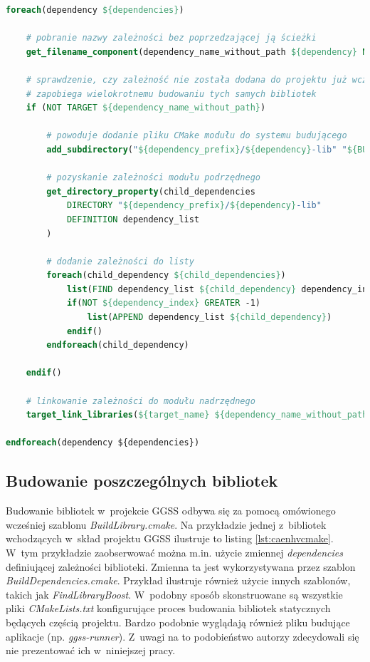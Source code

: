 \begin{lstlisting}[language=cmake, caption={Plik \textit{BuildDependencies.cmake} będący częścią systemu budującego projekt GGSS. Zawiera pętlę iterującą po zależnościach aktualnie budowanego modułu. Zależności te dodawane są do systemu budującego za pomocą polecenia \textit{add\_subdirectory}. Dołączone do listingu komentarze stanowią wytłumaczenie działania poszczególnych elementów pliku.}, label={lst:builddependenciescmake}]
foreach(dependency ${dependencies})
    
    # pobranie nazwy zależności bez poprzedzającej ją ścieżki
    get_filename_component(dependency_name_without_path ${dependency} NAME)

    # sprawdzenie, czy zależność nie została dodana do projektu już wcześniej - 
    # zapobiega wielokrotnemu budowaniu tych samych bibliotek
    if (NOT TARGET ${dependency_name_without_path})

        # powoduje dodanie pliku CMake modułu do systemu budującego
        add_subdirectory("${dependency_prefix}/${dependency}-lib" "${BUILD_OUTPUT_DIRECTORY}/${dependency_name_without_path}-lib/build")

        # pozyskanie zależności modułu podrzędnego 
        get_directory_property(child_dependencies 
            DIRECTORY "${dependency_prefix}/${dependency}-lib" 
            DEFINITION dependency_list
        )

        # dodanie zależności do listy 
        foreach(child_dependency ${child_dependencies})
            list(FIND dependency_list ${child_dependency} dependency_index)
            if(NOT ${dependency_index} GREATER -1)
                list(APPEND dependency_list ${child_dependency})
            endif()
        endforeach(child_dependency)
        
    endif()

    # linkowanie zależności do modułu nadrzędnego
    target_link_libraries(${target_name} ${dependency_name_without_path})

endforeach(dependency ${dependencies})
\end{lstlisting}


\subsection{Budowanie poszczególnych bibliotek}
Budowanie bibliotek w~projekcie GGSS odbywa się za pomocą omówionego wcześniej szablonu \textit{BuildLibrary.cmake}. Na przykładzie jednej z~bibliotek wchodzących w~skład projektu GGSS ilustruje to listing \ref{lst:caenhvcmake}. W~tym przykładzie zaobserwować można m.in. użycie zmiennej \textit{dependencies} definiującej zależności biblioteki. Zmienna ta jest wykorzystywana przez szablon \textit{BuildDependencies.cmake}. Przykład ilustruje również użycie innych szablonów, takich jak \textit{FindLibraryBoost}. W~podobny sposób skonstruowane są wszystkie pliki \textit{CMakeLists.txt} konfigurujące proces budowania bibliotek statycznych będących częścią projektu. Bardzo podobnie wyglądają również pliku budujące aplikacje (np. \textit{ggss-runner}). Z~uwagi na to podobieństwo autorzy zdecydowali się nie prezentować ich w~niniejszej pracy. 

